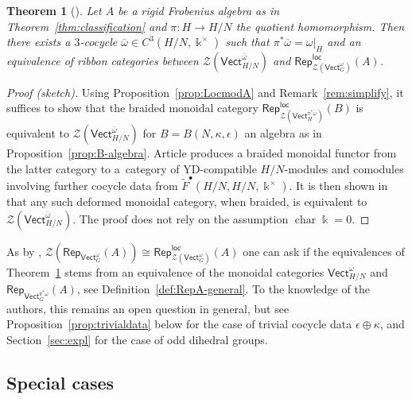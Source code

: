 \documentclass[pdftex]{sigma}
\numberwithin{equation}{section}
\newtheorem{Theorem}{Theorem}[section]
\newcommand{\ov}[1]{\overline{#1}}
\newcommand{\cha}{\operatorname{char}}
\newcommand{\wF}{\widetilde{F}}
\newcommand{\Rep}{\mathsf{Rep}}
\newcommand{\locmod}{\mathsf{Rep}^{\mathsf{loc}}}
\newcommand{\Vect}{\mathsf{Vect}}
\newcommand{\cZ}{\mathcal{Z}}
\begin{document}
\begin{Theorem}[{\cite[Theorem~3.16]{DS}}]\label{thm:DSlocal}
Let $A$ be a rigid Frobenius algebra as in Theorem~{\rm \ref{thm:classification}} and $\pi\colon H\to H/N$ the quotient homomorphism. Then there exists a $3$-cocycle $\ov{\omega}\in C^3(H/N, \Bbbk^\times)$ such that $\pi^*\ov{\omega}=\omega|_{H}$ and an equivalence of ribbon categories
between $\cZ(\Vect^{\ov{\omega}}_{H/N})$ and $\locmod_{\cZ(\Vect_G^\omega)}(A)$.
\end{Theorem}
\begin{proof}[Proof (sketch)]
Using Proposition~\ref{prop:LocmodA} and Remark~\ref{rem:simplify}, it suffices to show that the braided monoidal category $\locmod_{\cZ(\Vect_H^{\pi^*\ov{\omega}})}(B)$ is equivalent to $\cZ(\Vect_{H/N}^{\ov{\omega}})$ for $B=B(N,\kappa,\epsilon)$ an algebra as in Proposition~\ref{prop:B-algebra}. Article \cite{DS} produces a braided monoidal functor from the latter category to a~category of YD-compatible $H/N$-modules and comodules involving further cocycle data from $\wF^\bullet(H/N,H/N,\Bbbk^\times)$. It is then shown in \cite[Proposition A.1]{DS} that any such deformed monoidal category, when braided, is equivalent to $\cZ(\Vect_{H/N}^{\ov{\omega}})$. The proof does not rely on the assumption $\cha \Bbbk=0$.
\end{proof}

As by \cite{Sch}, $\cZ(\Rep_{\Vect_{G}^{\omega}}(A))\cong \locmod_{\cZ(\Vect_{G}^{\omega})}(A)$ one can ask if the equivalences of Theorem~\ref{thm:DSlocal} stems from an equivalence of the monoidal categories
$\Vect_{H/N}^{\ov{\omega}}$ and $\Rep_{\Vect_{G}^{\pi^*\ov{\omega}}}(A)$, see Definition~\ref{def:RepA-general}.
To the knowledge of the authors, this remains an open question in general, but see Proposition~\ref{prop:trivialdata} below for the case of trivial cocycle data $\epsilon\oplus\kappa $, and Section~\ref{sec:expl} for the case of odd dihedral groups.

\subsection{Special cases}
\end{document}
